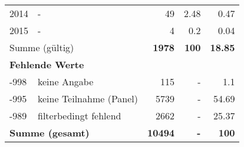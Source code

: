 \begin{longtable}{lXrrr}
     2014 &
     \multicolumn{1}{X}{ -  } &


       \num{49} &
       \num[round-mode=places,round-precision=2]{2,48} &
         \num[round-mode=places,round-precision=2]{0,47} \\

     2015 &
     \multicolumn{1}{X}{ -  } &


       \num{4} &
       \num[round-mode=places,round-precision=2]{0,2} &
         \num[round-mode=places,round-precision=2]{0,04} \\
     \midrule
     \multicolumn{2}{l}{Summe (gültig)} &
       \textbf{\num{1978}} &
     \textbf{100} &
       \textbf{\num[round-mode=places,round-precision=2]{18,85}} \\
     \multicolumn{5}{l}{\textbf{Fehlende Werte}}\\
       -998 &
       keine Angabe &
         \num{115} &
        - &
         \num[round-mode=places,round-precision=2]{1,1} \\
       -995 &
       keine Teilnahme (Panel) &
         \num{5739} &
        - &
         \num[round-mode=places,round-precision=2]{54,69} \\
       -989 &
       filterbedingt fehlend &
         \num{2662} &
        - &
         \num[round-mode=places,round-precision=2]{25,37} \\
     \midrule
     \multicolumn{2}{l}{\textbf{Summe (gesamt)}} &
          \textbf{\num{10494}} &
        \textbf{-} &
        \textbf{100} \\
     \bottomrule
     \end{longtable}
     
